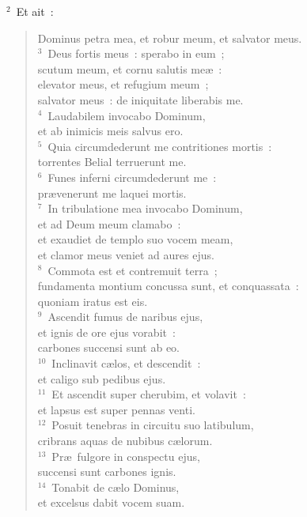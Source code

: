 ${}^{2}$~Et ait~: \begin{flushleft}\begin{verse}Dominus petra mea, et robur meum, et salvator meus.\\
${}^{3}$~Deus fortis meus~: sperabo in eum~;\\ scutum meum, et cornu salutis me\ae~:\\ elevator meus, et refugium meum~;\\ salvator meus~: de iniquitate liberabis me.\\
${}^{4}$~Laudabilem invocabo Dominum,\\ et ab inimicis meis salvus ero.\\
${}^{5}$~Quia circumdederunt me contritiones mortis~:\\ torrentes Belial terruerunt me.\\
${}^{6}$~Funes inferni circumdederunt me~:\\ pr\ae venerunt me laquei mortis.\\
${}^{7}$~In tribulatione mea invocabo Dominum,\\ et ad Deum meum clamabo~:\\ et exaudiet de templo suo vocem meam,\\ et clamor meus veniet ad aures ejus.\\
${}^{8}$~Commota est et contremuit terra~;\\ fundamenta montium concussa sunt, et conquassata~:\\ quoniam iratus est eis.\\
${}^{9}$~Ascendit fumus de naribus ejus,\\ et ignis de ore ejus vorabit~:\\ carbones succensi sunt ab eo.\\
${}^{10}$~Inclinavit c\ae los, et descendit~:\\ et caligo sub pedibus ejus.\\
${}^{11}$~Et ascendit super cherubim, et volavit~:\\ et lapsus est super pennas venti.\\
${}^{12}$~Posuit tenebras in circuitu suo latibulum,\\ cribrans aquas de nubibus c\ae lorum.\\
${}^{13}$~Pr\ae\ fulgore in conspectu ejus,\\ succensi sunt carbones ignis.\\
${}^{14}$~Tonabit de c\ae lo Dominus,\\ et excelsus dabit vocem suam.\\

\end{verse}
\end{flushleft}
